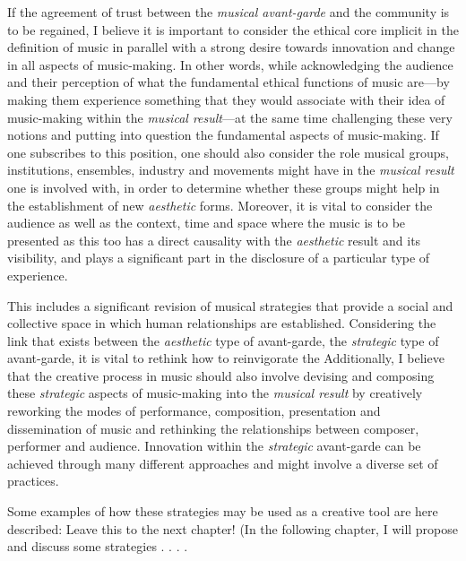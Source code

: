 If the agreement of trust between the \emph{musical avant-garde} and the community is to be regained, I believe it is important to consider the ethical core implicit in the definition of music in parallel with a strong desire towards innovation and change in all aspects of music-making. In other words, while acknowledging the audience and their perception of what the fundamental ethical functions of music are---by making them experience something that they would associate with their idea of music-making within the \emph{musical result}---at the same time challenging these very notions and putting into question the fundamental aspects of music-making. If one subscribes to this position, one should also consider the role musical groups, institutions, ensembles, industry and movements might have in the \emph{musical result} one is involved with, in order to determine whether these groups might help in the establishment of new \emph{aesthetic} forms. Moreover, it is vital to consider the audience as well as the context, time and space where the music is to be presented as this too has a direct causality with the \emph{aesthetic} result and its visibility, and plays a significant part in the disclosure of a particular type of experience. 

This includes a significant revision of musical strategies that provide a social and collective space in which human relationships are established. 
Considering the link that exists between the \emph{aesthetic} type of avant-garde, the \emph{strategic} type of avant-garde, it is vital to rethink how to reinvigorate the 
Additionally, I believe that the creative process in music should also involve devising and composing these \emph{strategic} aspects of music-making into the \emph{musical result} by creatively reworking the modes of performance, composition, presentation and dissemination of music and rethinking the relationships between composer, performer and audience. Innovation within the \emph{strategic} avant-garde can be achieved through many different approaches and might involve a diverse set of practices. 

Some examples of how these strategies may be used as a creative tool are here described: Leave this to the next chapter! (In the following chapter, I will propose and discuss some strategies . . . .

